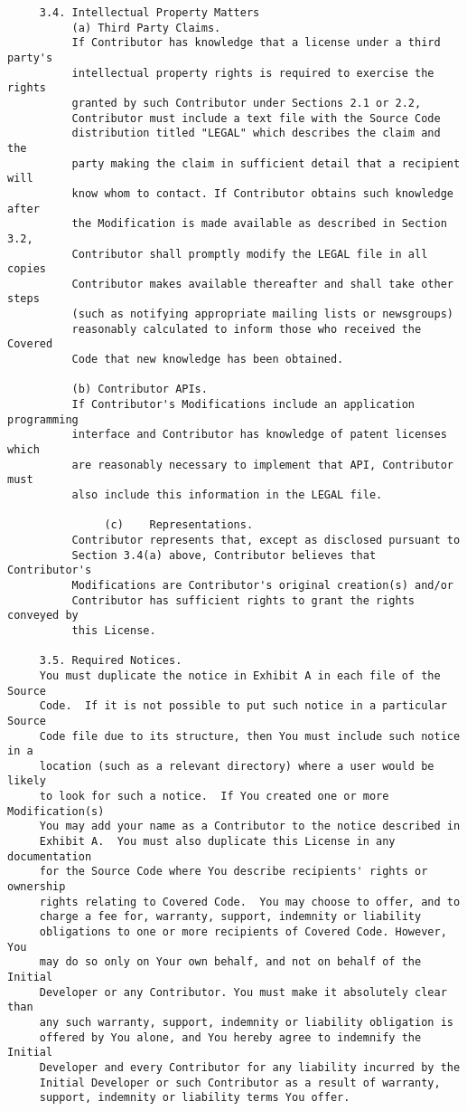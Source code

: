 \begin{verbatim}
     3.4. Intellectual Property Matters
          (a) Third Party Claims.
          If Contributor has knowledge that a license under a third party's
          intellectual property rights is required to exercise the rights
          granted by such Contributor under Sections 2.1 or 2.2,
          Contributor must include a text file with the Source Code
          distribution titled "LEGAL" which describes the claim and the
          party making the claim in sufficient detail that a recipient will
          know whom to contact. If Contributor obtains such knowledge after
          the Modification is made available as described in Section 3.2,
          Contributor shall promptly modify the LEGAL file in all copies
          Contributor makes available thereafter and shall take other steps
          (such as notifying appropriate mailing lists or newsgroups)
          reasonably calculated to inform those who received the Covered
          Code that new knowledge has been obtained.

          (b) Contributor APIs.
          If Contributor's Modifications include an application programming
          interface and Contributor has knowledge of patent licenses which
          are reasonably necessary to implement that API, Contributor must
          also include this information in the LEGAL file.

               (c)    Representations.
          Contributor represents that, except as disclosed pursuant to
          Section 3.4(a) above, Contributor believes that Contributor's
          Modifications are Contributor's original creation(s) and/or
          Contributor has sufficient rights to grant the rights conveyed by
          this License.

     3.5. Required Notices.
     You must duplicate the notice in Exhibit A in each file of the Source
     Code.  If it is not possible to put such notice in a particular Source
     Code file due to its structure, then You must include such notice in a
     location (such as a relevant directory) where a user would be likely
     to look for such a notice.  If You created one or more Modification(s)
     You may add your name as a Contributor to the notice described in
     Exhibit A.  You must also duplicate this License in any documentation
     for the Source Code where You describe recipients' rights or ownership
     rights relating to Covered Code.  You may choose to offer, and to
     charge a fee for, warranty, support, indemnity or liability
     obligations to one or more recipients of Covered Code. However, You
     may do so only on Your own behalf, and not on behalf of the Initial
     Developer or any Contributor. You must make it absolutely clear than
     any such warranty, support, indemnity or liability obligation is
     offered by You alone, and You hereby agree to indemnify the Initial
     Developer and every Contributor for any liability incurred by the
     Initial Developer or such Contributor as a result of warranty,
     support, indemnity or liability terms You offer.


\end{verbatim}
